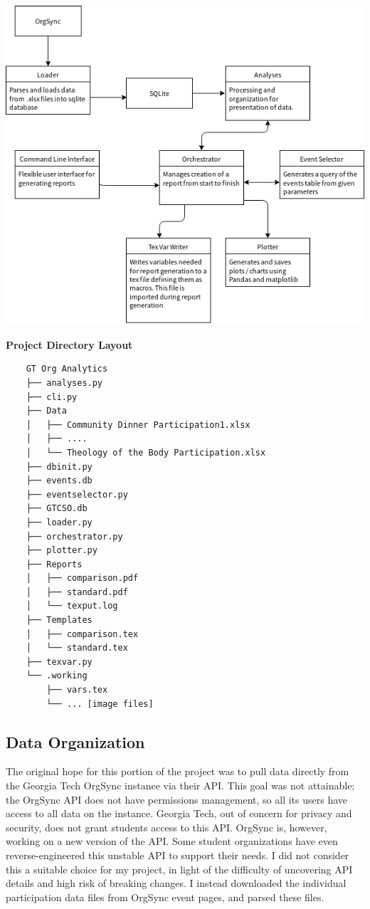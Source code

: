\documentclass[12pt]{article}
\begin{document}
\includegraphics[width=6in]{./media/architecture.png}
\pagebreak

\textbf{Project Directory Layout }
\begin{verbatim}
    GT Org Analytics
    ├── analyses.py
    ├── cli.py
    ├── Data
    │   ├── Community Dinner Participation1.xlsx
    │   ├── ....
    │   └── Theology of the Body Participation.xlsx
    ├── dbinit.py
    ├── events.db
    ├── eventselector.py
    ├── GTCSO.db
    ├── loader.py
    ├── orchestrator.py
    ├── plotter.py
    ├── Reports
    │   ├── comparison.pdf
    │   ├── standard.pdf
    │   └── texput.log
    ├── Templates
    │   ├── comparison.tex
    │   └── standard.tex
    ├── texvar.py
    └── .working
        ├── vars.tex
        └── ... [image files]
\end{verbatim}
\pagebreak

\subsection*{Data Organization}

The original hope for this portion of the project was to pull data directly from the Georgia Tech OrgSync instance via their API.
This goal was not attainable; the OrgSync API does not have permissions management, so all its users have access to all data on the instance.
Georgia Tech, out of concern for privacy and security, does not grant students access to this API.
OrgSync is, however, working on a new version of the API.
Some student organizations have even reverse-engineered this unstable API to support their needs.
I did not consider this a suitable choice for my project, in light of the difficulty of uncovering API details and high risk of breaking changes.
I instead downloaded the individual participation data files from OrgSync event pages, and parsed these files.
\end{document}
